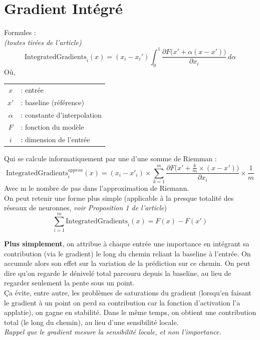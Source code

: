 \documentclass[12pt,a4paper]{article}
\begin{document}
\clearpage

\section*{Gradient Intégré}
Formules :\\
\small\textit{(toutes tirées de l'article)}
\[
\mathrm{IntegratedGradients}_i(x) = (x_i - x_i') \int_{0}^{1} \frac{\partial F\big(x' + \alpha (x - x')\big)}{\partial x_i} \, d\alpha
\]
Où,
\begin{center}
\begin{tabular}{c l}
$x$      & : entrée \\
$x'$     & : baseline (référence) \\
$\alpha$ & : constante d'interpolation \\
$F$      & : fonction du modèle \\
$i$      & : dimension de l'entrée \\
\end{tabular}
\end{center}

Qui se calcule informatiquement par une d'une somme de Riemman :
\[
\mathrm{IntegratedGradients}^{approx}_{i}(x) = (x_i - x'_i)\times\sum_{k=1}^{m} \frac{\partial F\big(x'+\frac{k}{m}\times(x-x')\big)}{\partial x_i}\times\frac{1}{m}
\]
Avec m le nombre de pas dans l'approximation de Riemann.\\

On peut retenir une forme plus simple (applicable à la presque totalité des réseaux de neuronnes, \textit{voir Proposition 1 de l'article})
\[
\sum_{i=1}^{m}\mathrm{IntegratedGradients}_i(x) = F(x) - F(x')
\]

\textbf{Plus simplement}, on attribue à chaque entrée une importance en intégrant sa contribution (via le gradient) le long du chemin reliant la baseline à l'entrée. On accumule alors son effet sur la variation de la prédiction sur ce chemin. On peut dire qu'on regarde le dénivelé total parcouru depuis la baseline, au lieu de regarder seulement la pente sous un point.\\

Ça évite, entre autre, les problèmes de saturations du gradient (lorsqu'en faisant le gradient à un point on perd sa contribution car la fonction d'activation l'a applatie), on gagne en stabilité. Dans le même temps, on obtient une contribution total (le long du chemin), au lieu d'une sensibilité locale.\\
\textit{Rappel que le gradient mesure la sensibilité locale, et non l'importance.}

\end{document}
